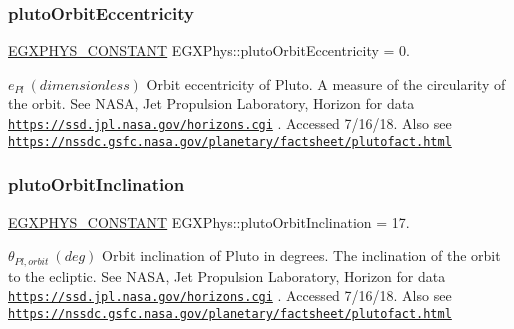 \subsubsection{\texorpdfstring{pluto\+Orbit\+Eccentricity}{plutoOrbitEccentricity}}
{\footnotesize\ttfamily \mbox{\hyperlink{group___e_g_x_phys-_constants-_macros_ga76980d288494ce1714c9ac68a95ba702}{E\+G\+X\+P\+H\+Y\+S\+\_\+\+C\+O\+N\+S\+T\+A\+NT}} E\+G\+X\+Phys\+::pluto\+Orbit\+Eccentricity = 0.}

$ e_{Pl} \ (dimensionless)$ Orbit eccentricity of Pluto. A measure of the circularity of the orbit. See N\+A\+SA, Jet Propulsion Laboratory, Horizon for data \href{https://ssd.jpl.nasa.gov/horizons.cgi}{\tt https\+://ssd.\+jpl.\+nasa.\+gov/horizons.\+cgi} . Accessed 7/16/18. Also see \href{https://nssdc.gsfc.nasa.gov/planetary/factsheet/plutofact.html}{\tt https\+://nssdc.\+gsfc.\+nasa.\+gov/planetary/factsheet/plutofact.\+html} \mbox{\label{group___e_g_x_phys-_constants-_astrophysics-_solar_system-_pluto-_orbit_ga6d2bac1a0cdd37f32f5a089608e7ce27}} 
\subsubsection{\texorpdfstring{pluto\+Orbit\+Inclination}{plutoOrbitInclination}}
{\footnotesize\ttfamily \mbox{\hyperlink{group___e_g_x_phys-_constants-_macros_ga76980d288494ce1714c9ac68a95ba702}{E\+G\+X\+P\+H\+Y\+S\+\_\+\+C\+O\+N\+S\+T\+A\+NT}} E\+G\+X\+Phys\+::pluto\+Orbit\+Inclination = 17.}

$ \theta_{Pl,orbit} \ (deg)$ Orbit inclination of Pluto in degrees. The inclination of the orbit to the ecliptic. See N\+A\+SA, Jet Propulsion Laboratory, Horizon for data \href{https://ssd.jpl.nasa.gov/horizons.cgi}{\tt https\+://ssd.\+jpl.\+nasa.\+gov/horizons.\+cgi} . Accessed 7/16/18. Also see \href{https://nssdc.gsfc.nasa.gov/planetary/factsheet/plutofact.html}{\tt https\+://nssdc.\+gsfc.\+nasa.\+gov/planetary/factsheet/plutofact.\+html} \mbox{\label{group___e_g_x_phys-_constants-_astrophysics-_solar_system-_pluto-_orbit_gab92279b96110352b230cee6071bedf81}} 
